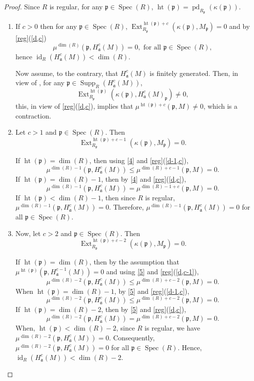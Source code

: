 \documentclass[12pt,twoside, final]{amsart}
\numberwithin{equation}{section}
\newtheorem{nota rem}[thm]{Notation and Remark}
\newtheorem{defen rem}[thm]{Definition and Remark}
\def\hei{\operatorname{ht}}
\def\pd{\operatorname{pd} }
\def\Ext{\operatorname{Ext}}
\def\Spec{\operatorname{Spec}}
\def\id{\operatorname{id}}
\def\Supp{\operatorname{Supp}}
\def\dim{\operatorname{dim}}
\newcommand{\p}{\mathfrak{p}}
\newcommand{\fa}{\mathfrak{a}}
\begin{document}
 \begin{proof}
 Since $R$ is regular, for any $\p\in \Spec(R)$, $  \hei(\p)= \pd_{R_{\p}}(\kappa(\p))$.
 \begin{enumerate}
     \item If $c> 0$  then for any $\p\in \Spec(R)$,  $\Ext^{\hei(\p)+ c}_{R_{\p}}(\kappa(\p), M_{\p})= 0$ and by \ref{reg}(\ref{d,c}) 
 \[\mu^{\dim(R)}(\p, H^c_{\fa}(M))= 0,\,\,\text{for all}\,\,\p\in \Spec(R),\]
 hence   $\id_{R}(H^c_{\fa}(M))< \dim(R)$. 
 
 Now assume, to the contrary, that $H^c_{\fa}(M)$ is finitely generated. Then, in view of \cite[Lemma 1, page 154]{mat}, 
 for any $\p\in \Supp_R(H^c_{\fa}(M))$,  $$\Ext_{R_{\p}}^{\hei(\p)}(\kappa(\p), H^c_{\fa}(M)_{\p})\neq 0,$$ this, in view of \ref{reg}(\ref{d,c}), implies that $\mu^{\hei(\p)+ c}(\p, M)\neq 0$, which is a contraction. 
 \item Let $c> 1$ and $\p\in \Spec(R)$. Then 
 \begin{equation}\label{4}
     \Ext^{\hei(\p)+ c- 1}_{R_{\p}}(\kappa(\p), M_{\p})= 0.
 \end{equation} 
  
      If $\hei(\p)= \dim(R)$, then using \ref{4} and \ref{reg}(\ref{d-1,c}), 
     \[\mu^{\dim(R)- 1}(\p, H^c_{\fa}(M))\leq \mu^{\dim(R)+ c- 1}(\p, M)= 0.\]
       If $\hei(\p)= \dim(R)- 1$, then   by \ref{4} and \ref{reg}(\ref{d,c}),
     \[\mu^{\dim(R)- 1}(\p, H^c_{\fa}(M))= \mu^{\dim(R)-1 +c}(\p, M)= 0.\]
       If $\hei(\p)< \dim(R)- 1$, then since $R$ is regular, $\mu^{\dim(R)- 1}(\p, H^c_{\fa}(M))= 0.$
       Therefore, $\mu^{\dim(R)- 1}(\p, H^c_{\fa}(M))= 0$ for all $\p\in \Spec(R)$.
     
   
 \item Now, let $c> 2$ and $\p\in \Spec(R)$. Then 
 \begin{equation}\label{5}
     \Ext^{\hei(\p)+ c- 2}_{R_{\p}}(\kappa(\p), M_{\p})= 0.
 \end{equation} 
 
       If $\hei(\p)= \dim(R)$,   then  by the assumption that  $\mu^{\hei(\p)}(\p, H^{c- 1}_{\fa}(M))= 0$ and   using \ref{5} and \ref{reg}(\ref{d,c-1}), 
     \[\mu^{\dim(R)- 2}(\p, H^c_{\fa}(M))\leq \mu^{\dim(R)+ c- 2}(\p, M)= 0.\]
       When $\hei(\p)= \dim(R)- 1$,     by \ref{5} and \ref{reg}(\ref{d-1,c}),
     \[\mu^{\dim(R)- 2}(\p, H^c_{\fa}(M))\leq \mu^{ \dim(R)+c- 2}(\p, M)= 0.\]
       If $\hei(\p)= \dim(R)- 2$, then by \ref{5} and \ref{reg}(\ref{d,c}),
    \[\mu^{\dim(R)- 2}(\p, H^c_{\fa}(M))=\mu^{ \dim(R)+c- 2}(\p, M)= 0.\] 
       When,  $\hei(\p)< \dim(R)- 2$,  since $R$ is regular, we have $\mu^{\dim(R)- 2}(\p, H^c_{\fa}(M))= 0.$
      Consequently, $\mu^{\dim(R)- 2}(\p, H^c_{\fa}(M))= 0$ for all $\p\in \Spec(R)$.
 Hence, $\id_{R}(H^c_{\fa}(M))< \dim(R)- 2.$
  \end{enumerate}
\end{proof}
\end{document}
